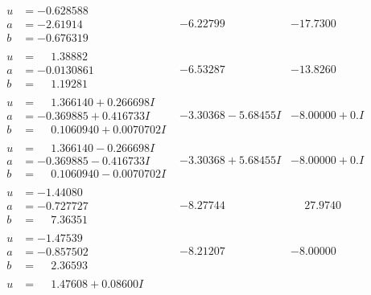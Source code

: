 \documentclass[1p]{elsarticle_modified}
\theoremstyle{definition}
\begin{document}
$$\begin{array}{c|c|c}
\begin{aligned}
u &= -0.628588\phantom{ +0.000000I} \\
a &= -2.61914\phantom{ +0.000000I} \\
b &= -0.676319\phantom{ +0.000000I}\end{aligned}
 & -6.22799\phantom{ +0.000000I} & -17.7300\phantom{ +0.000000I} \\ \hline\begin{aligned}
u &= \phantom{-}1.38882\phantom{ +0.000000I} \\
a &= -0.0130861\phantom{ +0.000000I} \\
b &= \phantom{-}1.19281\phantom{ +0.000000I}\end{aligned}
 & -6.53287\phantom{ +0.000000I} & -13.8260\phantom{ +0.000000I} \\ \hline\begin{aligned}
u &= \phantom{-}1.366140 + 0.266698 I \\
a &= -0.369885 + 0.416733 I \\
b &= \phantom{-}0.1060940 + 0.0070702 I\end{aligned}
 & -3.30368 - 5.68455 I & -8.00000 + 0. I\phantom{ +0.000000I} \\ \hline\begin{aligned}
u &= \phantom{-}1.366140 - 0.266698 I \\
a &= -0.369885 - 0.416733 I \\
b &= \phantom{-}0.1060940 - 0.0070702 I\end{aligned}
 & -3.30368 + 5.68455 I & -8.00000 + 0. I\phantom{ +0.000000I} \\ \hline\begin{aligned}
u &= -1.44080\phantom{ +0.000000I} \\
a &= -0.727727\phantom{ +0.000000I} \\
b &= \phantom{-}7.36351\phantom{ +0.000000I}\end{aligned}
 & -8.27744\phantom{ +0.000000I} & \phantom{-}27.9740\phantom{ +0.000000I} \\ \hline\begin{aligned}
u &= -1.47539\phantom{ +0.000000I} \\
a &= -0.857502\phantom{ +0.000000I} \\
b &= \phantom{-}2.36593\phantom{ +0.000000I}\end{aligned}
 & -8.21207\phantom{ +0.000000I} & -8.00000\phantom{ +0.000000I} \\ \hline\begin{aligned}
u &= \phantom{-}1.47608 + 0.08600 I \\

\end{aligned}
\end{array}$$
\end{document}
